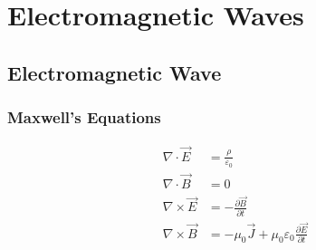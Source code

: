 %
%
\chapter{Electromagnetic Waves}
\label{chapter:lightwaves}

\section{Electromagnetic Wave}
%
%

%    


\subsection{Maxwell's Equations}

\begin{align}
  \nabla\cdot\vec E &=\frac\rho{\varepsilon_0}\label{eq:gauss-electricity}\\
  \nabla\cdot\vec B &= 0\label{eq:gauss-magnetism}\\
  \nabla\times\vec E &=-\frac{\partial\vec B}{\partial t}
  \label{eq:faradays-law-2}\\
  \nabla\times\vec B &=
  -\mu_0\vec J+\mu_0\varepsilon_0\frac{\partial\vec E}{\partial t}
  \label{eq:amperes-law}
\end{align}

